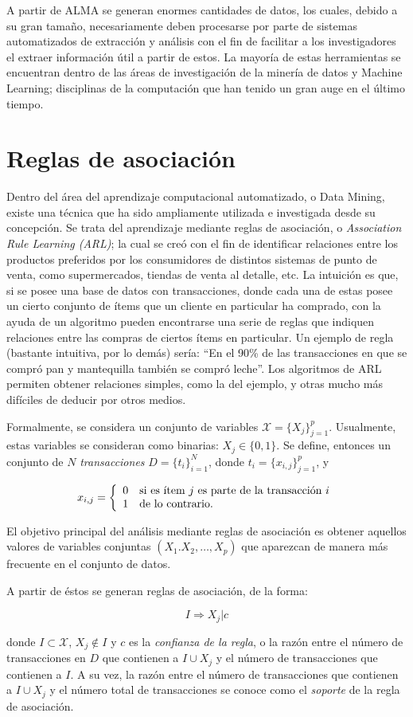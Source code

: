 A partir de ALMA se generan enormes cantidades de datos, los cuales, debido a su gran tamaño,  necesariamente deben procesarse por parte de sistemas automatizados de extracción y análisis con el fin de facilitar a los investigadores el extraer información útil a partir de estos. La mayoría de estas herramientas se encuentran dentro de las áreas de investigación de la minería de datos y Machine Learning; disciplinas de la computación que han tenido un gran auge en el último tiempo.

\section{Reglas de asociación}

Dentro del área del aprendizaje computacional automatizado, o Data Mining, existe una técnica que ha sido ampliamente utilizada e investigada desde su concepción. Se trata del aprendizaje mediante reglas de asociación, o \textit{Association Rule Learning (ARL)}; la cual se creó con el fin de identificar relaciones entre los productos preferidos por los consumidores de distintos sistemas de punto de venta, como supermercados, tiendas de venta al detalle, etc.
La intuición es que, si se posee una base de datos con transacciones, donde cada una de estas posee un cierto conjunto de ítems que un cliente en particular ha comprado, con la ayuda de un algoritmo pueden encontrarse una serie de reglas que indiquen relaciones entre las compras de ciertos ítems en particular. Un ejemplo de regla (bastante intuitiva, por lo demás) sería: “En el 90\% de las transacciones en que se compró pan y mantequilla también se compró leche”. Los algoritmos de ARL permiten obtener relaciones simples, como la del ejemplo, y otras mucho más difíciles de deducir por otros medios.

Formalmente, se considera un conjunto de variables $\mathcal{X}=\{X_{j}\}^p_{j=1}$. Usualmente, estas variables se consideran como binarias: $X_j\in\{0,1\}$. Se define, entonces un conjunto de $N$ \textit{transacciones} $D=\{t_i\}^N_{i=1}$, donde $t_i=\{x_{i,j}\}^p_{j=1}$, y

\[
x_{i,j}=
\left\{
\begin{array}{l l}
0 \quad \text{si es ítem $j$ es parte de la transacción $i$}\\
1 \quad \text{de lo contrario.}
\end{array}
\right.
\]

El objetivo principal del análisis mediante reglas de asociación es obtener aquellos valores de variables conjuntas $(X_1.X_2,\dots,X_p)$ que aparezcan de manera más frecuente en el conjunto de datos.

A partir de éstos se generan reglas de asociación, de la forma:

\[I \Rightarrow X_j\Big|c\]

donde $I\subset\mathcal{X}$, $X_j \notin I$ y $c$ es la \textit{confianza de la regla}, o la razón entre el número de transacciones en $D$ que contienen a $I \cup X_j$ y el número de transacciones que contienen a $I$. A su vez, la razón entre el número de transacciones que contienen a $I \cup X_j$ y el número total de transacciones se conoce como el \textit{soporte} de la regla de asociación.
